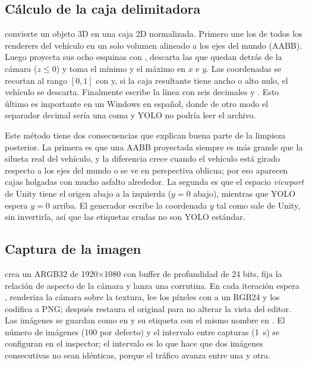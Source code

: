 \documentclass[11pt,a4paper]{article}
\begin{document}
\subsection{Cálculo de la caja delimitadora}

 convierte un objeto 3D en una caja 2D normalizada. Primero une los  de todos los renderers del vehículo en un solo volumen alineado a los ejes del mundo (AABB). Luego proyecta sus ocho esquinas con , descarta las que quedan detrás de la cámara ($z \le 0$) y toma el mínimo y el máximo en $x$ e $y$. Las coordenadas se recortan al rango $[0, 1]$ con  y, si la caja resultante tiene ancho o alto nulo, el vehículo se descarta. Finalmente  escribe la línea  con seis decimales y . Esto último es importante en un Windows en español, donde de otro modo el separador decimal sería una coma y YOLO no podría leer el archivo.

Este método tiene dos consecuencias que explican buena parte de la limpieza posterior. La primera es que una AABB proyectada siempre es más grande que la silueta real del vehículo, y la diferencia crece cuando el vehículo está girado respecto a los ejes del mundo o se ve en perspectiva oblicua; por eso aparecen cajas holgadas con mucho asfalto alrededor. La segunda es que el espacio \emph{viewport} de Unity tiene el origen abajo a la izquierda ($y = 0$ abajo), mientras que YOLO espera $y = 0$ arriba. El generador escribe la coordenada $y$ tal como sale de Unity, sin invertirla, así que las etiquetas crudas no son YOLO estándar.

\subsection{Captura de la imagen}

 crea un  ARGB32 de 1920$\times$1080 con buffer de profundidad de 24 bits, fija la relación de aspecto de la cámara y lanza una corrutina. En cada iteración espera , renderiza la cámara sobre la textura, lee los píxeles con  a un  RGB24 y los codifica a PNG; después restaura el  original para no alterar la vista del editor. Las imágenes se guardan como  en  y su etiqueta con el mismo nombre en . El número de imágenes (100 por defecto) y el intervalo entre capturas (1~s) se configuran en el inspector; el intervalo es lo que hace que dos imágenes consecutivas no sean idénticas, porque el tráfico avanza entre una y otra.
\end{document}
